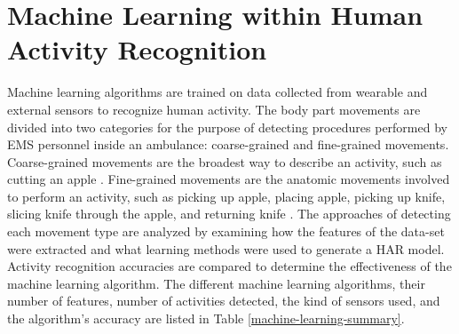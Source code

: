 \section{Machine Learning within Human Activity Recognition}
\label{sec:Literature-Review:Machine-Learning-Classifiers}
Machine learning algorithms are trained on data collected from wearable and external sensors to recognize human activity. The body part movements are divided into two categories for the purpose of detecting procedures performed by EMS personnel inside an ambulance: coarse-grained and fine-grained movements. Coarse-grained movements are the broadest way to describe an activity, such as cutting an apple \cite{Dirk2010}. Fine-grained movements are the anatomic movements involved to perform an activity, such as picking up apple, placing apple, picking up knife, slicing knife through the apple, and returning knife \cite{Dirk2010}. The approaches of detecting each movement type are analyzed by examining how the features of the data-set were extracted and what learning methods were used to generate a HAR model. Activity recognition accuracies are compared to determine the effectiveness of the machine learning algorithm. The different machine learning algorithms, their number of features, number of activities detected, the kind of sensors used, and the algorithm's accuracy are listed in Table \ref{machine-learning-summary}.
